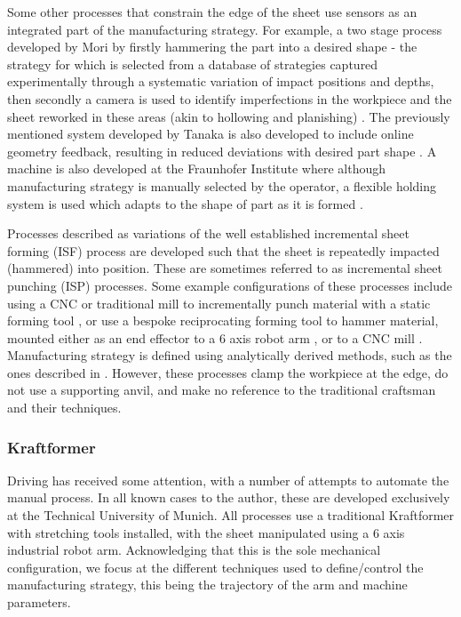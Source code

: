Some other processes that constrain the edge of the sheet use sensors as an integrated part of the manufacturing strategy.  For example, a two stage process developed by Mori by firstly hammering the part into a desired shape -  the strategy for which is selected from a database of strategies captured experimentally through a systematic variation of impact positions and depths, then secondly a camera is used to identify imperfections in the workpiece and the sheet reworked in these areas (akin to hollowing and planishing) \citep{Mori1998IncrementalDatabase}. The previously mentioned system developed by Tanaka is also developed to include online geometry feedback, resulting  in reduced deviations with desired part shape \citep{Tanaka2014DevelopmentHammering}. A machine is also developed at the Fraunhofer Institute where although manufacturing strategy is manually selected by the operator, a flexible holding system is used which adapts to the shape of part as it is formed \citep{Sharon2014FraunhoferReport}.

Processes described as variations of the well established incremental sheet forming (ISF) process are developed such that the sheet is repeatedly impacted (hammered) into position. These are sometimes referred to as incremental sheet punching (ISP) processes. Some example configurations of these processes include using a CNC or traditional mill to incrementally punch material with a static forming tool \citep{Wang2017IncrementalPath,Zhu2019ToolForming}, or use a bespoke reciprocating forming tool to hammer material, mounted either as an end effector to a 6 axis robot arm \citep{Schafer2005IncrementalRobots, Puzik2008IncrementalApplication, Luo2010AResults}, or to a CNC mill \citep{Asgari2017DesignDamper}. Manufacturing strategy is defined using analytically derived methods, such as the ones described in \citep{Sedighi2015AnProcess,Zhu2019ToolForming,Luo2010ASimulation}. However, these processes clamp the workpiece at the edge, do not use a supporting anvil, and make no reference to the traditional craftsman and their techniques.
 

\subsubsection*{Kraftformer} \label{sec:MechKraftformer}
Driving has received some attention, with a number of attempts to automate the manual process. In all known cases to the author, these are developed exclusively at the Technical University of Munich. All processes use a traditional Kraftformer with stretching tools installed, with the sheet manipulated using a 6 axis industrial robot arm. Acknowledging that this is the sole mechanical configuration, we focus at the different techniques used to define/control the manufacturing strategy, this being the trajectory of the arm and machine parameters.

